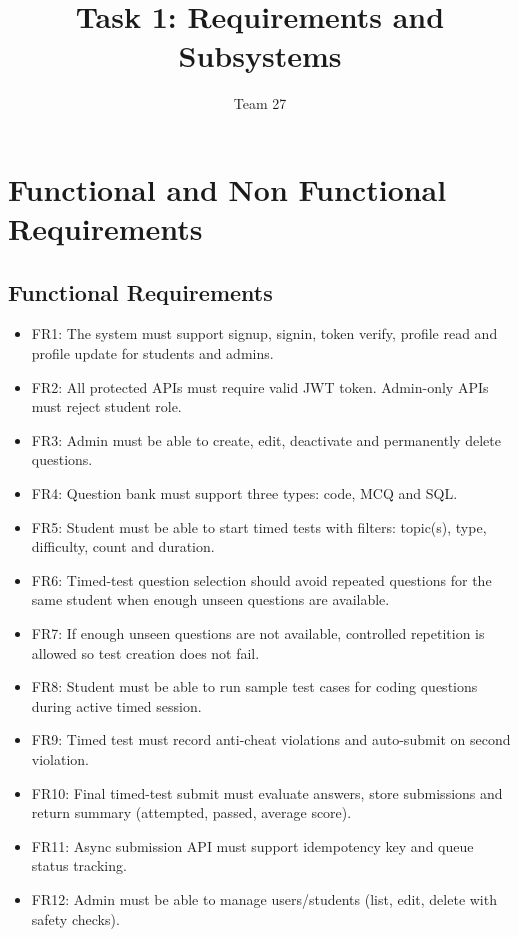 \documentclass[12pt,journal,onecolumn]{IEEEtran}
\begin{document}
\title{Task 1: Requirements and Subsystems}
\author{Team 27}
\maketitle

\section{Functional and Non Functional Requirements}

\subsection{Functional Requirements}
\begin{itemize}
    \item FR1: The system must support signup, signin, token verify, profile read and profile update for students and admins.
    \item FR2: All protected APIs must require valid JWT token. Admin-only APIs must reject student role.
    \item FR3: Admin must be able to create, edit, deactivate and permanently delete questions.
    \item FR4: Question bank must support three types: code, MCQ and SQL.
    \item FR5: Student must be able to start timed tests with filters: topic(s), type, difficulty, count and duration.
    \item FR6: Timed-test question selection should avoid repeated questions for the same student when enough unseen questions are available.
    \item FR7: If enough unseen questions are not available, controlled repetition is allowed so test creation does not fail.
    \item FR8: Student must be able to run sample test cases for coding questions during active timed session.
    \item FR9: Timed test must record anti-cheat violations and auto-submit on second violation.
    \item FR10: Final timed-test submit must evaluate answers, store submissions and return summary (attempted, passed, average score).
    \item FR11: Async submission API must support idempotency key and queue status tracking.
    \item FR12: Admin must be able to manage users/students (list, edit, delete with safety checks).
\end{itemize}
\end{document}
